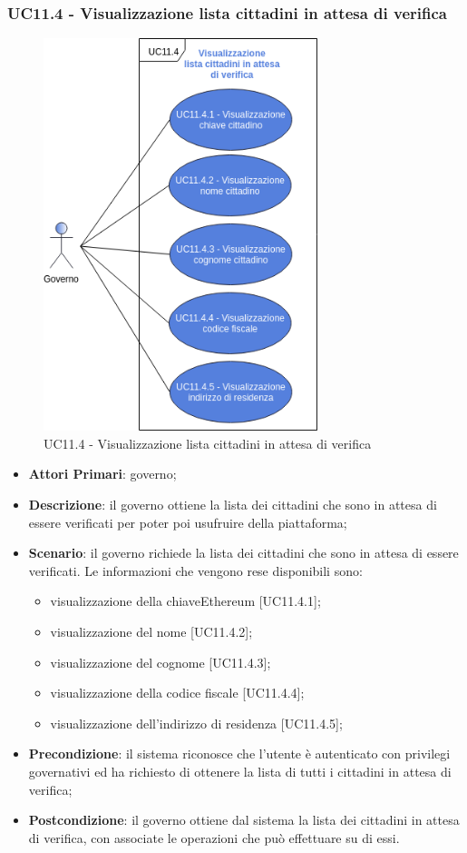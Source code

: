 \subsubsection{UC11.4 - Visualizzazione lista cittadini in attesa di verifica}
\begin{figure}[h]
	\includegraphics[width=8cm]{res/images/UC11-4.png} %
	\centering
	\caption{UC11.4 - Visualizzazione lista cittadini in attesa di verifica}
\end{figure}
\begin{itemize}
	\item \textbf{Attori Primari}: governo;
	\item \textbf{Descrizione}: il governo ottiene la lista dei cittadini che sono in attesa di essere verificati per poter poi usufruire della piattaforma;
	\item \textbf{Scenario}: il governo richiede la lista dei cittadini che sono in attesa di essere verificati. Le informazioni che vengono rese disponibili sono:
	\begin{itemize}
		\item visualizzazione della chiave\glosp Ethereum [UC11.4.1];
		\item visualizzazione del nome [UC11.4.2];
		\item visualizzazione del cognome [UC11.4.3];
		\item visualizzazione della codice fiscale [UC11.4.4];
		\item visualizzazione dell'indirizzo di residenza [UC11.4.5];
		
	\end{itemize}
	\item \textbf{Precondizione}: il sistema riconosce che l'utente è autenticato con privilegi governativi ed ha richiesto di ottenere la lista di tutti i cittadini in attesa di verifica;
	\item \textbf{Postcondizione}: il governo ottiene dal sistema la lista dei cittadini in attesa di verifica, con associate le operazioni che può effettuare su di essi.
\end{itemize}

